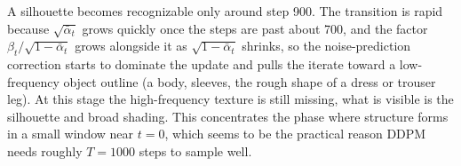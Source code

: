 \documentclass{article}
\begin{document}

A silhouette becomes recognizable only around step 900. The transition is
rapid because $\sqrt{\bar\alpha_t}$ grows quickly once the steps are past
about 700, and the factor $\beta_t / \sqrt{1-\bar\alpha_t}$ grows
alongside it as $\sqrt{1-\bar\alpha_t}$ shrinks, so the noise-prediction
correction starts to dominate the update and pulls the iterate toward a
low-frequency object outline (a body, sleeves, the rough shape of a dress
or trouser leg). At this stage the high-frequency texture is still
missing, what is visible is the silhouette and broad shading. This
concentrates the phase where structure forms in a small window near
$t = 0$, which seems to be the practical reason DDPM needs roughly
$T = 1000$ steps to sample well.





\end{document}
